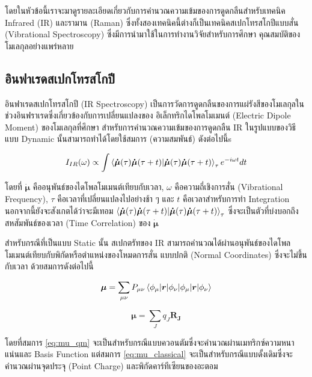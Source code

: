 \noindent โดยในหัวข้อนี้เราจะมาดูรายละเอียดเกี่ยวกับการคำนวณความเข้มของการดูดกลืนสำหรับเทคนิค Infrared (IR) และรามาน (Raman) 
ซึ่งทั้งสองเทคนิคนี้ต่างก็เป็นเทคนิคสเปกโทรสโกปีแบบสั่น (Vibrational Spectroscopy) ซึ่งมีการนำมาใช้ในการทำงานวิจัยสำหรับการศึกษา%
คุณสมบัติของโมเลกุลอย่างแพร่หลาย

\subsection{อินฟาเรดสเปกโทรสโกปี}
\label{ssec:ir_spectro}

อินฟาเรดสเปกโทรสโกปี (IR Spectroscopy) เป็นการวัดการดูดกลืนของการแผ่รังสีของโมเลกุลในช่วงอินฟราเรดซึ่งเกี่ยวข้องกับการเปลี่ยนแปลงของ%
อิเล็กทริกไดโพลโมเมนต์ (Electric Dipole Moment) ของโมเลกุลที่ศึกษา สำหรับการคำนวณความเข้มของการดูดกลืน IR ในรูปแบบของวิธีแบบ
Dynamic นั้นสามารถทำได้โดยใช้สมการ (ความสมพันธ์) ดังต่อไปนี้s\autocite{thomas2013}

\begin{equation}\label{eq:IR_corr}
    I_{IR} (\omega) \propto \int \braket{\bm{\dot{\mu}}(\tau) \bm{\dot{\mu}}(\tau+t)}_{\tau} e^{-i \omega t} dt
\end{equation}

\noindent โดยที่ $\bm{\dot{\mu}}$ คืออนุพันธ์ของไดโพลโมเมนต์เทียบกับเวลา, $\omega$ คือความถี่เชิงการสั่น (Vibrational Frequency),
$\tau$ คือเวลาที่เปลี่ยนแปลงไปอย่างช้า ๆ และ $t$ คือเวลาสำหรับการทำ Integration นอกจากนี้ยังจะสังเกตได้ว่าจะมีเทอม
$\braket{\bm{\dot{\mu}}(\tau) \bm{\dot{\mu}}(\tau+t)}_{\tau}$ ซึ่งจะเป็นตัวที่บ่งบอกถึงสหสัมพันธ์ของเวลา (Time Correlation) 
ของ $\bm{\dot{\mu}}$ 

สำหรับกรณีที่เป็นแบบ Static นั้น สเปกตรัทของ IR สามารถคำนวณได้ผ่านอนุพันธ์ของไดโพลโมเมนต์เทียบกับพิกัดหรือตำแหน่งของโหมดการสั่น%
แบบปกติ (Normal Coordinates) ซึ่งจะไม่ขึ้นกับเวลา ด้วยสมการดังต่อไปนี้

\begin{equation}\label{eq:mu_qm}
    \bm{\mu}= \sum_{\mu\nu} P_{\mu\nu} \braket{\phi_{\mu}|\bm{r}|\phi_{\nu}}
\end{equation}

\begin{equation}\label{eq:mu_classical}
    \bm{\mu}=\sum_{J} q_J \bm{R_J}
\end{equation}

โดยที่สมการ \ref{eq:mu_qm} จะเป็นสำหรับกรณีแบบควอนตัมซึ่งจะคำนวณผ่านเมทริกซ์ความหนาแน่นและ Basis Function แต่สมการ 
\ref{eq:mu_classical} จะเป็นสำหรับกรณีแบบดั้งเดิมซึ่งจะคำนวณผ่านจุดประจุ (Point Charge) และพิกัดคาร์ทีเซียนของอะตอม


